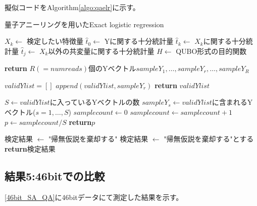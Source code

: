 擬似コードをAlgorithm\ref{algo:qaelr}に示す。

{\scriptsize
	\begin{algorithm}
		\caption{量子アニーリングを用いたExact logistic regression}
		\label{algo:qaelr}
		\begin{algorithmic}
			\State $X_k \leftarrow$ 検定したい特徴量
			\State $\hat{t}_0 \leftarrow$ Yに関する十分統計量
			\State $\hat{t}_k \leftarrow$ $X_k$に関する十分統計量
			\State $\hat{t}_j \leftarrow$ $X_k$以外の共変量に関する十分統計量
			\State $H \leftarrow$ QUBO形式の目的関数
			
			\State \textbf{return} $R(=numreads)$個のYベクトル$sampleY_1, \dots, sampleY_r, \dots, sampleY_R$
			\EndProcedure
			
			\State $validYlist= []$
			\State $append(validYlist, sampleY_r)$
			\EndIf
			\EndIf
			\EndFor
			\State \textbf{return} $validYlist$
			\EndProcedure
			
			\newpage
			\State $S  \leftarrow validYlist$に入っているYベクトルの数
			\State $sampleY_s \leftarrow validYlist$に含まれるYベクトル($s= 1, \dots , S$)
			\State $samplecount \leftarrow 0$
			\State $samplecount \leftarrow  samplecount + 1$
			\EndIf
			\EndFor
			\State $p \leftarrow samplecount/S$
			\State \textbf{return}$p$
			\EndProcedure
			
			\State 検定結果 $\leftarrow$ "帰無仮説を棄却する"
			\Else
			\State 検定結果 $\leftarrow$ "帰無仮説を棄却する"とする
			\EndIf
			\State \textbf{return}検定結果
			\EndProcedure
		\end{algorithmic} 
	\end{algorithm}
}


\subsection{結果5:46bitでの比較}
\ref{46bit_SA_QA}に46bitデータにて測定した結果を示す。

